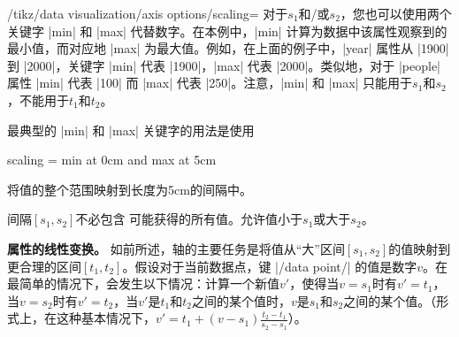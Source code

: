 \begin{key}{/tikz/data visualization/axis options/scaling=}
    对于$s_1$和/或$s_2$，您也可以使用两个关键字 |min| 和 |max| 代替数字。在本例中，|min| 计算为数据中该属性观察到的最小值，而对应地 |max| 为最大值。例如，在上面的例子中，|year| 属性从 |1900| 到 |2000|，关键字 |min| 代表 |1900|，|max| 代表 |2000|。类似地，对于 |people| 属性 |min| 代表 |100| 而 |max| 代表 |250|。注意，|min| 和 |max| 只能用于$s_1$和$s_2$，不能用于$t_1$和$t_2$。


    最典型的 |min| 和 |max| 关键字的用法是使用
\begin{codeexample}
scaling = min at 0cm and max at 5cm
\end{codeexample}
    将值的整个范围映射到长度为5cm的间隔中。


    间隔$[s_1,s_2]$不必包含  可能获得的所有值。允许值小于$s_1$或大于$s_2$。


    \medskip

    \textbf{属性的线性变换。} 如前所述，轴的主要任务是将值从``大''区间$[s_1,s_2]$的值映射到更合理的区间$[t_1,t_2]$。假设对于当前数据点，键 |/data point/| 的值是数字$v$。在最简单的情况下，会发生以下情况：计算一个新值$v'$，使得当$v=s_1$时有$v'= t_1$，当$v=s_2$时有$v'=t_2$，当$v'$是$t_1$和$t_2$之间的某个值时，$v$是$s_1$和$s_2$之间的某个值。（形式上，在这种基本情况下，$v' = t_1 + (v-s_1)\frac{t_2-t_1}{s_2-s_1}$）。



\end{key}
